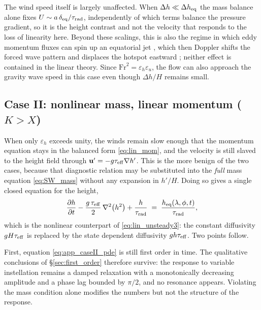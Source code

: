 \documentclass[trackchanges,twocolumn]{aastex7}
\begin{document}
The wind speed itself is largely unaffected. When $\Delta h \ll \Delta h_{\rm eq}$ the mass
balance alone fixes $U \sim a\,\delta_{\rm eq}/\tau_{\rm rad}$, independently of which terms
balance the pressure gradient, so it is the height contrast and not the velocity that responds
to the loss of linearity here. Beyond these scalings, this is also the regime in which eddy
momentum fluxes can spin up an equatorial jet \citep{ShowmanPolvani2011}, which then Doppler
shifts the forced wave pattern and displaces the hotspot eastward
\citep{HammondPierrehumbert2018, tsai2014three}; neither effect is contained in the linear
theory. Since $\mathrm{Fr}^{2} = \varepsilon_h \varepsilon_u$, the flow can also approach the
gravity wave speed in this case even though $\Delta h/H$ remains small.

\subsection{Case II: nonlinear mass, linear momentum ($K > X$)}
\label{sec:app_caseII}

When only $\varepsilon_h$ exceeds unity, the winds remain slow enough that the momentum
equation stays in the balanced form \eqref{eq:lin_mom}, and the velocity is still slaved to the
height field through $\mathbf{u}' = -g\tau_{\rm eff}\nabla h'$. This is the more benign of the
two cases, because that diagnostic relation may be substituted into the \emph{full} mass
equation \eqref{eq:SW_mass} without any expansion in $h'/H$. Doing so gives a single closed
equation for the height,
\begin{equation}
    \frac{\partial h}{\partial t}
    - \frac{g\,\tau_{\rm eff}}{2}\,\nabla^{2}\!\left(h^{2}\right)
    + \frac{h}{\tau_{\rm rad}}
    \;=\; \frac{h_{\rm eq}(\lambda,\phi,t)}{\tau_{\rm rad}},
    \label{eq:app_caseII_pde}
\end{equation}
which is the nonlinear counterpart of \eqref{eq:lin_unsteady3}: the constant diffusivity
$gH\tau_{\rm eff}$ is replaced by the state dependent diffusivity $g h \tau_{\rm eff}$. Two
points follow.

First, equation \eqref{eq:app_caseII_pde} is still first order in time. The qualitative
conclusions of \S\ref{sec:first_order} therefore survive: the response to variable instellation
remains a damped relaxation with a monotonically decreasing amplitude and a phase lag bounded
by $\pi/2$, and no resonance appears. Violating the mass condition alone modifies the numbers
but not the structure of the response.
\end{document}
